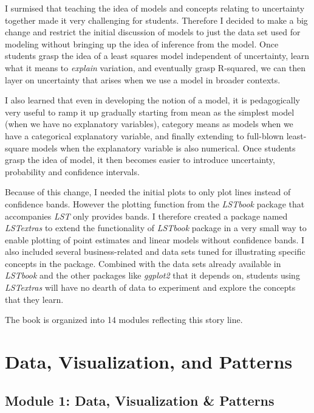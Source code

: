 \documentclass[
  12pt,
  letterpaper,
  DIV=11,
  numbers=noendperiod]{scrreprt}
\begin{document}
I surmised that teaching the idea of models and concepts relating to
uncertainty together made it very challenging for students. Therefore I
decided to make a big change and restrict the initial discussion of
models to just the data set used for modeling without bringing up the
idea of inference from the model. Once students grasp the idea of a
least squares model independent of uncertainty, learn what it means to
\emph{explain} variation, and eventually grasp R-squared, we can then
layer on uncertainty that arises when we use a model in broader
contexts.

I also learned that even in developing the notion of a model, it is
pedagogically very useful to ramp it up gradually starting from mean as
the simplest model (when we have no explanatory variables), category
means as models when we have a categorical explanatory variable, and
finally extending to full-blown least-square models when the explanatory
variable is also numerical. Once students grasp the idea of model, it
then becomes easier to introduce uncertainty, probability and confidence
intervals.

Because of this change, I needed the initial plots to only plot lines
instead of confidence bands. However the plotting function from the
\emph{LSTbook} package that accompanies \emph{LST} only provides bands.
I therefore created a package named \emph{LSTextras} to extend the
functionality of \emph{LSTbook} package in a very small way to enable
plotting of point estimates and linear models without confidence bands.
I also included several business-related and data sets tuned for
illustrating specific concepts in the package. Combined with the data
sets already available in \emph{LSTbook} and the other packages like
\emph{ggplot2} that it depends on, students using \emph{LSTextras} will
have no dearth of data to experiment and explore the concepts that they
learn.

The book is organized into 14 modules reflecting this story line.

\part{Data, Visualization, and Patterns}

\chapter*{Module 1: Data, Visualization \&
Patterns}\label{module-1-data-visualization-patterns}
\end{document}
